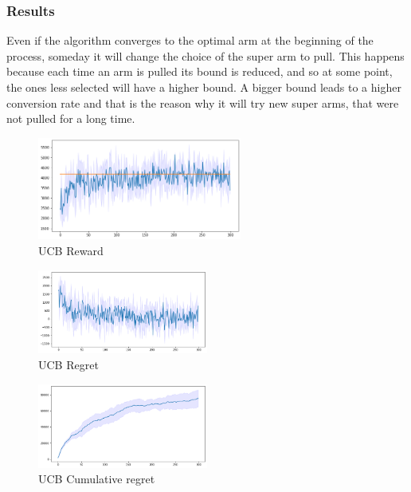 \subsubsection{Results}
Even if the algorithm converges to the optimal arm at the beginning of the process, someday it will change the choice of the super arm to pull. This happens because each time an arm is pulled its bound is reduced, and so at some point, the ones less selected will have a higher bound. A bigger bound leads to a higher conversion rate and that is the reason why it will try new super arms, that were not pulled for a long time.
\begin{figure}[ht]
    \begin{center}
    \includegraphics[width=0.6\textwidth]{img/ucb3.png}
    \caption{UCB Reward}
    \label{fig:reward31}
    \end{center}
\end{figure}
\begin{multicols}{2}
    \begin{figure}[H]
        \begin{center}
        \includegraphics[width=0.5\textwidth]{img/ucb3_regret.png}
        \caption{UCB Regret}
        \label{fig:regret31}
        \end{center}
    \end{figure}
    \columnbreak
    \begin{figure}[H]
        \begin{center}
        \includegraphics[width=0.5\textwidth]{img/ucb3_cum_reg.png}
        \caption{UCB Cumulative regret}
        \label{fig:cum_reg31}
        \end{center}
    \end{figure}
\end{multicols}



